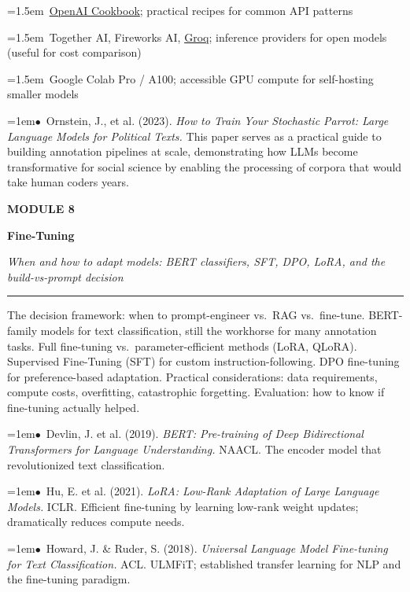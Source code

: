 \documentclass[11pt, a4paper]{article}
\newcommand{\modulehead}[3]{%
  \vspace{0.5em}
  {\small\sffamily\bfseries\textcolor{accent}{MODULE #1}}\par\vspace{-0.3em}
  {\Large\sffamily\bfseries\textcolor{dark}{#2}}\par\vspace{-0.2em}
  {\small\textit{\textcolor{muted}{#3}}}\par
  \vspace{0.2em}\textcolor{bordercol}{\rule{\textwidth}{0.3pt}}\par
}
\newcommand{\seclabel}[1]{%
  \vspace{0.6em}{\normalsize\sffamily\bfseries\textcolor{accent}{#1}}\par\vspace{0.2em}
}
\newcommand{\refpaper}[1]{%
  \par\hangindent=1em\hangafter=1\noindent\textcolor{accent}{\small$\bullet$}~{\small #1}\par
}
\newcommand{\resource}[1]{%
  \par\hangindent=1.5em\hangafter=1\noindent\hspace{0.5em}{\small\textcolor{accent}{\guilsinglright}}~{\small #1}\par
}
\begin{document}
\resource{\href{https://cookbook.openai.com}{OpenAI Cookbook}; practical recipes for common API patterns}

\resource{Together AI, Fireworks AI, \href{https://groq.com}{Groq}; inference providers for open models (useful for cost comparison)}

\resource{Google Colab Pro / A100; accessible GPU compute for self-hosting smaller models}

\seclabel{Social Science Application}

\refpaper{Ornstein, J., et al. (2023). \textit{How to Train Your Stochastic Parrot: Large Language Models for Political Texts.} This paper serves as a practical guide to building annotation pipelines at scale, demonstrating how LLMs become transformative for social science by enabling the processing of corpora that would take human coders years.}

\vspace{1.5em}

\modulehead{8}{Fine-Tuning}{When and how to adapt models: BERT classifiers, SFT, DPO, LoRA, and the build-vs-prompt decision}

\seclabel{Core Concepts}

The decision framework: when to prompt-engineer vs.\ RAG vs.\ fine-tune. BERT-family models for text classification, still the workhorse for many annotation tasks. Full fine-tuning vs.\ parameter-efficient methods (LoRA, QLoRA). Supervised Fine-Tuning (SFT) for custom instruction-following. DPO fine-tuning for preference-based adaptation. Practical considerations: data requirements, compute costs, overfitting, catastrophic forgetting. Evaluation: how to know if fine-tuning actually helped.

\seclabel{Core Readings}

\refpaper{Devlin, J. et al. (2019). \textit{BERT: Pre-training of Deep Bidirectional Transformers for Language Understanding.} NAACL. The encoder model that revolutionized text classification.}

\refpaper{Hu, E. et al. (2021). \textit{LoRA: Low-Rank Adaptation of Large Language Models.} ICLR. Efficient fine-tuning by learning low-rank weight updates; dramatically reduces compute needs.}

\refpaper{Howard, J. \& Ruder, S. (2018). \textit{Universal Language Model Fine-tuning for Text Classification.} ACL. ULMFiT; established transfer learning for NLP and the fine-tuning paradigm.}

\seclabel{Further Resources}
\end{document}
